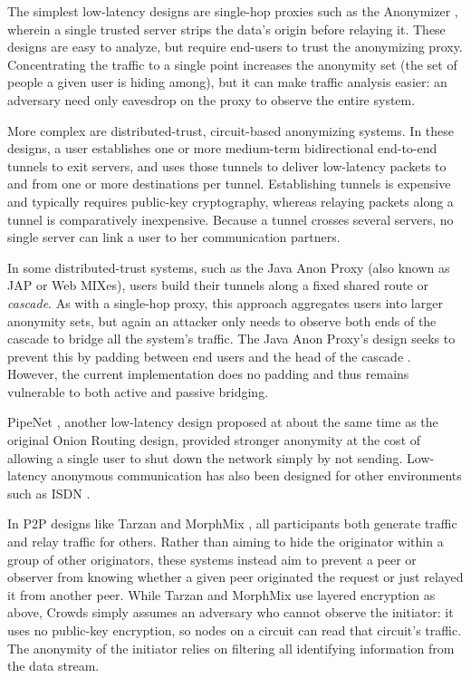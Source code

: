 \documentclass[times,10pt,twocolumn]{article}
\begin{document}
The simplest low-latency designs are single-hop proxies such as the
Anonymizer \cite{anonymizer}, wherein a single trusted server strips the
data's origin before relaying it.  These designs are easy to
analyze, but require end-users to trust the anonymizing proxy. 
Concentrating the traffic to a single point increases the anonymity set
(the set of people a given user is hiding among), but it can make traffic
analysis easier: an adversary need only eavesdrop on the proxy to observe
the entire system.

More complex are distributed-trust, circuit-based anonymizing systems.  In
these designs, a user establishes one or more medium-term bidirectional
end-to-end tunnels to exit servers, and uses those tunnels to deliver
low-latency packets to and from one or more destinations per
tunnel. %
Establishing tunnels is expensive and typically
requires public-key cryptography, whereas relaying packets along a tunnel is
comparatively inexpensive.  Because a tunnel crosses several servers, no
single server can link a user to her communication partners.

In some distributed-trust systems, such as the Java Anon Proxy (also known
as JAP or Web MIXes), users build their tunnels along a fixed shared route
or \emph{cascade}.  As with a single-hop proxy, this approach aggregates
users into larger anonymity sets, but again an attacker only needs to
observe both ends of the cascade to bridge all the system's traffic.
The Java Anon Proxy's design seeks to prevent this by padding
between end users and the head of the cascade \cite{web-mix}. However, the
current implementation does no padding and thus remains vulnerable
to both active and passive bridging.

PipeNet \cite{back01, pipenet}, another low-latency design proposed at
about the same time as the original Onion Routing design, provided
stronger anonymity at the cost of allowing a single user to shut
down the network simply by not sending.  Low-latency anonymous
communication has also been designed for other environments such as
ISDN \cite{isdn-mixes}.

In P2P designs like Tarzan \cite{tarzan:ccs02} and MorphMix
\cite{morphmix:fc04}, all participants both generate traffic and relay
traffic for others. Rather than aiming to hide the originator within a
group of other originators, these systems instead aim to prevent a peer
or observer from knowing whether a given peer originated the request
or just relayed it from another peer. While Tarzan and MorphMix use
layered encryption as above, Crowds \cite{crowds-tissec} simply assumes
an adversary who cannot observe the initiator: it uses no public-key
encryption, so nodes on a circuit can read that circuit's traffic. The
anonymity of the initiator relies on filtering all identifying information
from the data stream.
\end{document}
